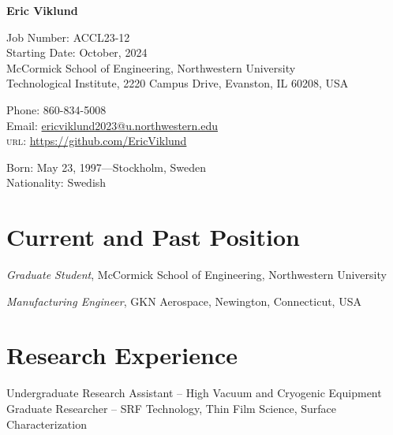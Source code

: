 \documentclass[11pt]{article} %
\begin{document}

{\LARGE\bfseries Eric Viklund} %
\bigskip\medskip %

Job Number: ACCL23-12\\
Starting Date: October, 2024\\

McCormick School of Engineering,  Northwestern University\\ %
Technological Institute, 2220 Campus Drive, Evanston, IL 60208, USA
\medskip %

Phone: 860-834-5008\\ %
Email: \href{mailto:ericviklund2023@u.northwestern.edu}{ericviklund2023@u.northwestern.edu}\\ %
\textsc{url}: \href{https://github.com/EricViklund}{https://github.com/EricViklund} %

\medskip  %


Born: May 23, 1997---Stockholm, Sweden\\ %
Nationality: Swedish %


\section*{Current and Past Position}

\emph{Graduate Student}, McCormick School of Engineering,  Northwestern University %


\emph{Manufacturing Engineer}, GKN Aerospace, Newington, Connecticut, USA


\section*{Research Experience}

Undergraduate Research Assistant -- High Vacuum and Cryogenic Equipment\\
Graduate Researcher -- SRF Technology, Thin Film Science, Surface Characterization 
\end{document}
